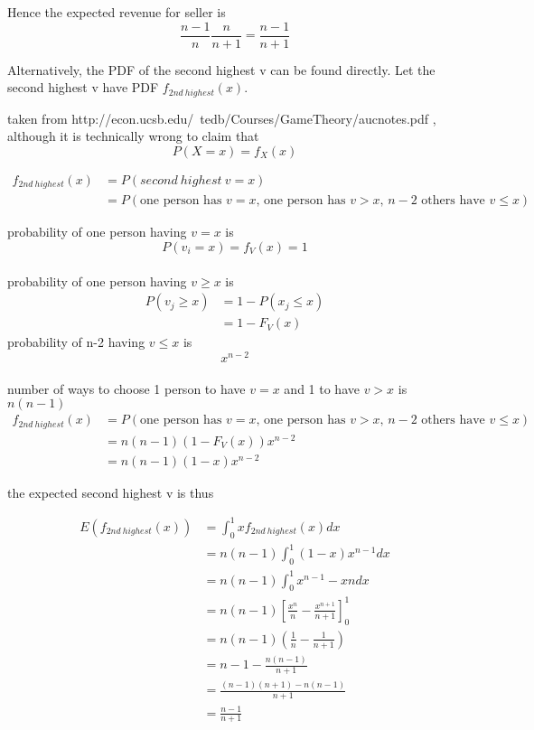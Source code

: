 \documentclass[10pt, a4paper]{article}
\begin{document}
Hence the expected revenue for seller is 
\[\frac{n-1}{n}\frac{n}{n+1} = \frac{n-1}{n+1}\]

Alternatively, the PDF of the second highest v can be found directly. Let the second highest v have PDF $f_{2nd\ highest}(x)$.

taken from http://econ.ucsb.edu/~tedb/Courses/GameTheory/aucnotes.pdf , although it is technically wrong to claim that 
\[ P(X = x) = f_X(x) \]

\begin{align*}
   f_{2nd\  highest}(x) &= P(second\ highest\ v = x) \\
                      &= P(\text{one person has $v = x$, one person has $v > x$, $n-2$ others have $v \le x$})
\end{align*}

probability of one person having $v = x$ is \[ P(v_i = x) = f_V(x) = 1\] \\
probability of one person having $v \ge x$ is 
\begin{align*}
  P(v_j \ge x)  &= 1 - P(x_j \le x)  \\
                &= 1 - F_V(x)
\end{align*}
probability of n-2 having $v \le x$ is \[ x^{n-2}\] \\
number of ways to choose 1 person to have $v = x$ and 1 to have $v > x$ is $n (n-1)$ \\

\begin{align*}
   f_{2nd\  highest}(x) &= P(\text{one person has $v = x$, one person has $v > x$, $n-2$ others have $v \le x$}) \\ 
     &= n(n-1)(1-F_V(x))x^{n-2} \\
     &= n(n-1)(1-x)x^{n-2} 
\end{align*}

the expected second highest v is thus

\begin{align*}
   E(f_{2nd\  highest}(x)) &= \int_0^1 x f_{2nd\  highest}(x) dx \\
                           &= n(n-1) \int_0^1 (1-x)x^{n-1} dx \\
                           &= n(n-1) \int_0^1 x^{n-1} - x{n} dx \\
                           &= n(n-1) \left[ \frac{x^n}{n} - \frac{x^{n+1}}{n+1}\right]_0^1 \\
                           &= n(n-1) \left( \frac{1}{n} - \frac{1}{n+1} \right) \\
                           &= n - 1 - \frac{n(n-1)}{n+1} \\
                           &= \frac{(n-1)(n+1) - n(n-1)}{n+1} \\
                           &= \frac{n-1}{n+1}
\end{align*}
\end{document}
